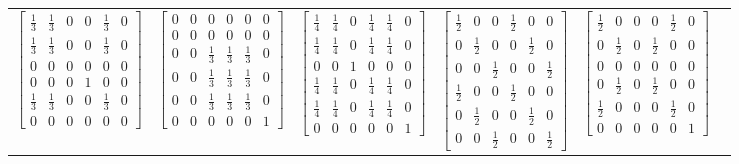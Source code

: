 \documentclass[preprint]{iucr}              %
\begin{document}
\begin{table}
\begin{tabular}{cccccc}
			$\begin{bmatrix} \tfrac{1}{3} & \tfrac{1}{3} & 0 & 0 & \tfrac{1}{3} & 0 \\ \tfrac{1}{3} & \tfrac{1}{3} & 0 & 0 & \tfrac{1}{3} & 0 \\ 0 & 0 & 0 & 0 & 0 & 0 \\ 0 & 0 & 0 & 1 & 0 & 0 \\ \tfrac{1}{3} & \tfrac{1}{3} & 0 & 0 & \tfrac{1}{3} & 0 \\ 0 & 0 & 0 & 0 & 0 & 0 \end{bmatrix}$ &
			$\begin{bmatrix} 0 & 0 & 0 & 0 & 0 & 0 \\ 0 & 0 & 0 & 0 & 0 & 0 \\ 0 & 0 & \tfrac{1}{3} & \tfrac{1}{3} & \tfrac{1}{3} & 0 \\ 0 & 0 & \tfrac{1}{3} & \tfrac{1}{3} & \tfrac{1}{3} & 0 \\ 0 & 0 & \tfrac{1}{3} & \tfrac{1}{3} & \tfrac{1}{3} & 0 \\ 0 & 0 & 0 & 0 & 0 & 1 \end{bmatrix}$ &
			$\begin{bmatrix} \tfrac{1}{4} & \tfrac{1}{4} & 0 & \tfrac{1}{4} & \tfrac{1}{4} & 0 \\ \tfrac{1}{4} & \tfrac{1}{4} & 0 & \tfrac{1}{4} & \tfrac{1}{4} & 0 \\ 0 & 0 & 1 & 0 & 0 & 0 \\ \tfrac{1}{4} & \tfrac{1}{4} & 0 & \tfrac{1}{4} & \tfrac{1}{4} & 0 \\ \tfrac{1}{4} & \tfrac{1}{4} & 0 & \tfrac{1}{4} & \tfrac{1}{4} & 0 \\ 0 & 0 & 0 & 0 & 0 & 1 \end{bmatrix}$ &
			$\begin{bmatrix} \tfrac{1}{2} & 0 & 0 & \tfrac{1}{2} & 0 & 0 \\ 0 & \tfrac{1}{2} & 0 & 0 & \tfrac{1}{2} & 0 \\ 0 & 0 & \tfrac{1}{2} & 0 & 0 & \tfrac{1}{2} \\ \tfrac{1}{2} & 0 & 0 & \tfrac{1}{2} & 0 & 0 \\ 0 & \tfrac{1}{2} & 0 & 0 & \tfrac{1}{2} & 0 \\ 0 & 0 & \tfrac{1}{2} & 0 & 0 & \tfrac{1}{2} \end{bmatrix}$ &
			$\begin{bmatrix} \tfrac{1}{2} & 0 & 0 & 0 & \tfrac{1}{2} & 0 \\ 0 & \tfrac{1}{2} & 0 & \tfrac{1}{2} & 0 & 0 \\ 0 & 0 & 0 & 0 & 0 & 0 \\ 0 & \tfrac{1}{2} & 0 & \tfrac{1}{2} & 0 & 0 \\ \tfrac{1}{2} & 0 & 0 & 0 & \tfrac{1}{2} & 0 \\ 0 & 0 & 0 & 0 & 0 & 1 \end{bmatrix}$ \\

\end{tabular}
\end{table}
\end{document}
